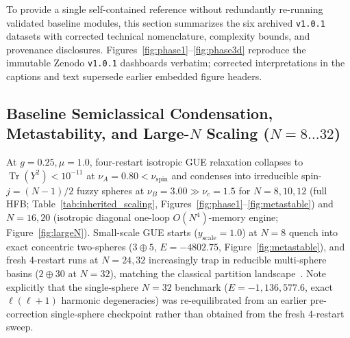 \documentclass[11pt,a4paper]{article}
\DeclareMathOperator{\Tr}{Tr}
\begin{document}
To provide a single self-contained reference without redundantly re-running validated baseline modules, this section summarizes the six archived \texttt{v1.0.1} datasets with corrected technical nomenclature, complexity bounds, and provenance disclosures. Figures~\ref{fig:phase1}--\ref{fig:phase3d} reproduce the immutable Zenodo \texttt{v1.0.1} dashboards verbatim; corrected interpretations in the captions and text supersede earlier embedded figure headers.

\subsection{Baseline Semiclassical Condensation, Metastability, and Large-$N$ Scaling ($N=8\dots 32$)}
At $g=0.25, \mu=1.0$, four-restart isotropic GUE relaxation collapses to $\Tr(Y^2) < 10^{-11}$ at $\nu_A = 0.80 < \nu_{\mathrm{spin}}$ and condenses into irreducible spin-$j=(N-1)/2$ fuzzy spheres at $\nu_B = 3.00 \gg \nu_c = 1.5$ for $N=8, 10, 12$ (full HFB; Table~\ref{tab:inherited_scaling}, Figures~\ref{fig:phase1}--\ref{fig:metastable}) and $N=16, 20$ (isotropic diagonal one-loop $O(N^4)$-memory engine; Figure~\ref{fig:largeN}). Small-scale GUE starts ($y_{\mathrm{scale}}=1.0$) at $N=8$ quench into exact concentric two-spheres ($3\oplus 5$, $E=-4802.75$, Figure~\ref{fig:metastable}), and fresh 4-restart runs at $N=24, 32$ increasingly trap in reducible multi-sphere basins ($2\oplus 30$ at $N=32$), matching the classical partition landscape~\cite{Myers1999,Azuma2004}. Note explicitly that the single-sphere $N=32$ benchmark ($E=-1{,}136{,}577.6$, exact $\ell(\ell+1)$ harmonic degeneracies) was re-equilibrated from an earlier pre-correction single-sphere checkpoint rather than obtained from the fresh 4-restart sweep.
\end{document}

